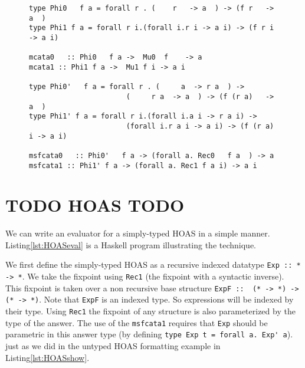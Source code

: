 \documentclass[a4paper,UKenglish]{lipics}
\begin{document}
\begin{figure}
\begin{lstlisting}[caption={TODO \label{lst:reccomb}}]
type Phi0   f a = forall r . (    r   -> a  ) -> (f r   -> a  )
type Phi1 f a = forall r i.(forall i.r i -> a i) -> (f r i -> a i)

mcata0   :: Phi0   f a ->  Mu0  f    -> a
mcata1 :: Phi1 f a ->  Mu1 f i -> a i

type Phi0'   f a = forall r . (     a  -> r a  ) ->
                       (     r a  -> a  ) -> (f (r a)   -> a  )
type Phi1' f a = forall r i.(forall i.a i -> r a i) ->
                       (forall i.r a i -> a i) -> (f (r a) i -> a i)

msfcata0   :: Phi0'   f a -> (forall a. Rec0   f a  ) -> a
msfcata1 :: Phi1' f a -> (forall a. Rec1 f a i) -> a i
\end{lstlisting}
\vspace*{-3ex}
\end{figure}

\begin{figure}

\vspace*{-3ex}
\end{figure}

\section{TODO HOAS TODO}\label{sec:HOASeval}
We can write an evaluator for a simply-typed HOAS
in a simple manner. Listing\;\ref{lst:HOASeval}
is a Haskell program illustrating the technique.

We first define the simply-typed HOAS as a recursive indexed datatype
\lstinline{Exp :: * -> *}. We take the fixpoint using \lstinline{Rec1}
(the fixpoint with a syntactic inverse). This fixpoint is taken over
a non recursive base structure \lstinline{ExpF ::  (* -> *) -> (* -> *)}.
Note that \lstinline{ExpF} is an indexed type. So expressions will be indexed
by their type. Using \lstinline{Rec1} the fixpoint of any structure is also
parameterized by the type of the answer. The use of the \lstinline{msfcata1}
requires that \lstinline{Exp} should be parametric in this answer type
(by defining \lstinline{type Exp t = forall a. Exp' a}). just as we did
in the untyped HOAS formatting example in Listing\;\ref{lst:HOASshow}.

\begin{figure}

\vspace*{-3ex}
\end{figure}
\end{document}
